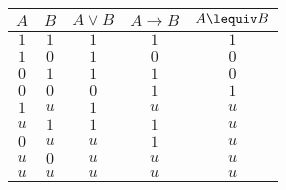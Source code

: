 \begin{tehtavasivu}
\begin{tehtava}
	\begin{vastaus}
		\begin{center}
		\begin{tabular}{|c|c|c|c|c|}\hline
		$A$ & $B$ & $A\lor B$ & $A\to B$ & $A\lequiv B$ \\ \hline
		$1$ & $1$ & $1$ & $1$ & $1$ \\
		$1$ & $0$ & $1$ & $0$ & $0$ \\
		$0$ & $1$ & $1$ & $1$ & $0$ \\
		$0$ & $0$ & $0$ & $1$ & $1$ \\
		$1$ & $u$ & $1$ & $u$ & $u$ \\
		$u$ & $1$ & $1$ & $1$ & $u$ \\
		$0$ & $u$ & $u$ & $1$ & $u$ \\
		$u$ & $0$ & $u$ & $u$ & $u$ \\
		$u$ & $u$ & $u$ & $u$ & $u$ \\ \hline
		\end{tabular}
		\end{center}
	\end{vastaus}
\end{tehtava}

\end{tehtavasivu}



